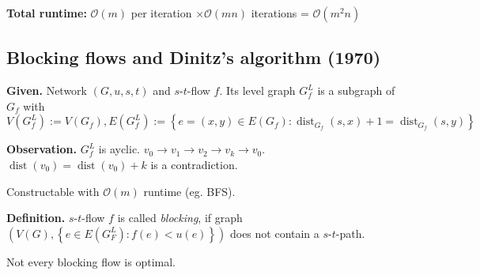 \documentclass{article}
\newcommand{\set}[1]{\left\{#1\right\}}
\newcommand{\given}[1]{\textbf{Given.} #1\par}
\newcommand{\gath}[2]{$#1$-$#2$-path} %
\begin{document}
\textbf{Total runtime:}
  $\mathcal{O}(m)$ per iteration $\times \mathcal{O}(mn)$ iterations = $\mathcal{O}(m^2n)$

\subsection{Blocking flows and Dinitz's algorithm (1970)}
%
\given{Network $(G, u, s, t)$ and $s$-$t$-flow $f$. Its level graph $G_f^L$ is a subgraph of $G_f$ with
\[
  V(G_f^L) := V(G_f), E(G_f^L) := \set{e = (x, y) \in E(G_f):
    \operatorname{dist}_{G_f}(s, x) + 1 = \operatorname{dist}_{G_f}(s, y)
  }
\]}

\textbf{Observation.}
  $G_f^L$ is ayclic. $v_0 \rightarrow v_1 \rightarrow v_2 \rightarrow v_k \rightarrow v_0$. $\operatorname{dist}(v_0) = \operatorname{dist}(v_0) + k$ is a contradiction.

Constructable with $\mathcal{O}(m)$ runtime (eg. BFS).

\textbf{Definition.} $s$-$t$-flow $f$ is called \emph{blocking}, if graph $(V(G), \set{e \in E(G_F^L): f(e) < u(e)})$ does not contain a \gath st.

\clearpage
Not every blocking flow is optimal.
\end{document}
